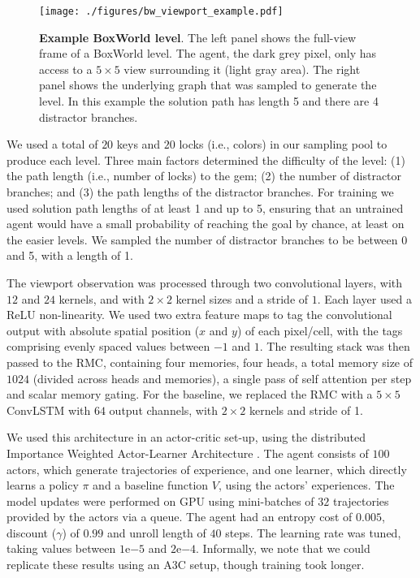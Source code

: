 \documentclass{article}
\begin{document}
\begin{figure}
    \centering
    \texttt{[image: ./figures/bw\_viewport\_example.pdf]}
    \caption{\textbf{Example BoxWorld level}. The left panel shows the full-view frame of a BoxWorld level. The agent, the dark grey pixel, only has access to a $5 \times 5$ view surrounding it (light gray area). The right panel shows the underlying graph that was sampled to generate the level. In this example the solution path has length 5 and there are 4 distractor branches.}
    \label{fig:boxworld}
\end{figure}

We used a total of $20$ keys and $20$ locks (i.e., colors) in our sampling pool to produce each level. Three main factors determined the difficulty of the level: (1) the path length (i.e., number of locks) to the gem; (2) the number of distractor branches; and (3) the path lengths of the distractor branches. For training we used solution path lengths of at least 1 and up to 5, ensuring that an untrained agent would have a small probability of reaching the goal by chance, at least on the easier levels. We sampled the number of distractor branches to be between 0 and 5, with a length of 1. 

The viewport observation was processed through two convolutional layers, with $12$ and $24$ kernels, and with $2 \times 2$ kernel sizes and a stride of $1$. Each layer used a ReLU non-linearity. We used two extra feature maps to tag the convolutional output with absolute spatial position ($x$ and $y$) of each pixel/cell, with the tags comprising evenly spaced values between $-1$ and $1$. The resulting stack was then passed to the RMC, containing four memories, four heads, a total memory size of $1024$ (divided across heads and memories), a single pass of self attention per step and scalar memory gating. For the baseline, we replaced the RMC with a $5 \times 5$ ConvLSTM with $64$ output channels, with $2 \times 2$ kernels and stride of 1.

We used this architecture in an actor-critic set-up, using the distributed Importance Weighted Actor-Learner Architecture \citep{espeholt2018impala}. The agent consists of $100$ actors, which generate trajectories of experience, and one learner, which directly learns a policy $\pi$ and a baseline function $V$, using the actors' experiences. The model updates were performed on GPU using mini-batches of $32$ trajectories provided by the actors via a queue. The agent had an entropy cost of $0.005$, discount ($\gamma$) of $0.99$ and unroll length of $40$ steps. The learning rate was tuned, taking values between $1\mathrm{e}{-5}$ and $2\mathrm{e}{-4}$. Informally, we note that we could replicate these results using an A3C setup, though training took longer. 
\end{document}

